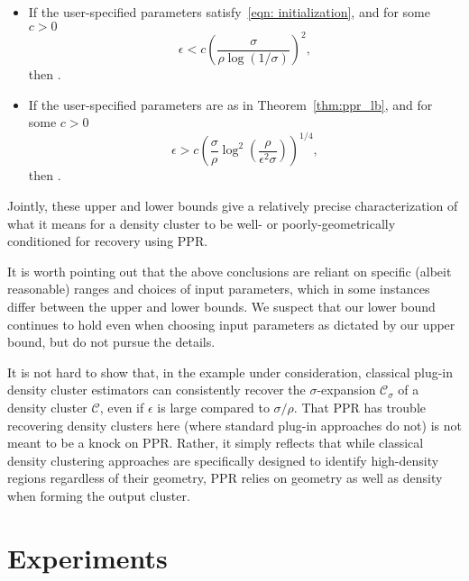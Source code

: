 \documentclass[11pt,twoside]{article}
\newcommand{\vol}{\mathrm{vol}}
\newcommand{\1}{\mathbbm{1}}
\newcommand{\Xbf}{X}
\newcommand{\Cset}{\mathcal{C}}
\newcommand{\Csig}{\Cset_{\sigma}}
\newcommand{\Cest}{\widehat{C}}
\begin{document}
\begin{itemize}
\item If the user-specified parameters satisfy~\eqref{eqn: initialization}, and
  for some $c > 0$
  $$
  \epsilon < c \left(\frac{\sigma}{\rho \log(1/\sigma)}\right)^2,
  $$
  then \smash{$\Delta(\Cest, \Cset^{(1)}[\Xbf]) \leq c \cdot
    \vol_{n,r}(\Cset^{(1)}[\Xbf])$}.

\item If the user-specified parameters are as in Theorem~\ref{thm:ppr_lb},
  and for some $c>0$
  $$
  \epsilon > c \left({\frac{\sigma}{\rho}} \log^2 \left(\frac{\rho}
      {\epsilon^2 \sigma}\right)\right)^{1/4},
  $$
  then \smash{$\Delta(\Cest, \Cset^{(1)}[\Xbf]) \geq \frac{1}{8}
    \vol_{n,r}(\Cset^{(1)}[\Xbf])$}. 
\end{itemize}

Jointly, these upper and lower bounds give a relatively precise characterization
of what it means for a density cluster to be well- or poorly-geometrically
conditioned for recovery using PPR. 

\begin{remark}
It is worth pointing out that the above conclusions are reliant on specific
(albeit reasonable) ranges and choices of input parameters, which in some
instances differ between the upper and lower bounds. We suspect that our lower
bound continues to hold even when choosing input parameters as dictated by our
upper bound, but do not pursue the details.
\end{remark}

\begin{remark}
It is not hard to show that, in the example under consideration, classical
plug-in density cluster estimators can consistently recover the
$\sigma$-expansion $\Csig$ of a density cluster $\Cset$, even if $\epsilon$ is
large compared to $\sigma/\rho$. That PPR has trouble recovering density
clusters here (where standard plug-in approaches do not) is not meant to
be a knock on PPR. Rather, it simply reflects that while classical density
clustering approaches are specifically designed to identify high-density regions
regardless of their geometry, PPR relies on geometry as well as density when
forming the output cluster. 
\end{remark}

\section{Experiments}
\label{sec: experiments}
\end{document}
